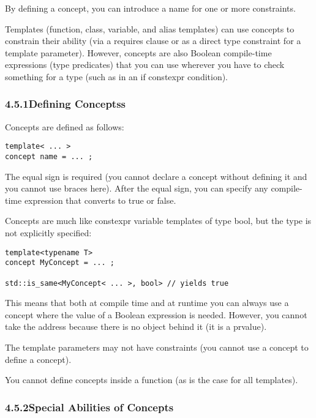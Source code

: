 
By defining a concept, you can introduce a name for one or more constraints.

Templates (function, class, variable, and alias templates) can use concepts to constrain their ability (via a requires clause or as a direct type constraint for a template parameter). However, concepts are also Boolean compile-time expressions (type predicates) that you can use wherever you have to check something for a type (such as in an if constexpr condition).


\subsubsection*{ 4.5.1\hspace{0.2cm}Defining Conceptss}

Concepts are defined as follows:

\begin{lstlisting}[style=styleCXX]
template< ... >
concept name = ... ;
\end{lstlisting}

The equal sign is required (you cannot declare a concept without defining it and you cannot use braces here).
After the equal sign, you can specify any compile-time expression that converts to true or false.

Concepts are much like constexpr variable templates of type bool, but the type is not explicitly specified:

\begin{lstlisting}[style=styleCXX]
template<typename T>
concept MyConcept = ... ;

std::is_same<MyConcept< ... >, bool> // yields true
\end{lstlisting}

This means that both at compile time and at runtime you can always use a concept where the value of a Boolean expression is needed. However, you cannot take the address because there is no object behind it (it is a prvalue).

The template parameters may not have constraints (you cannot use a concept to define a concept).

You cannot define concepts inside a function (as is the case for all templates).

\subsubsection*{ 4.5.2\hspace{0.2cm}Special Abilities of Concepts}

